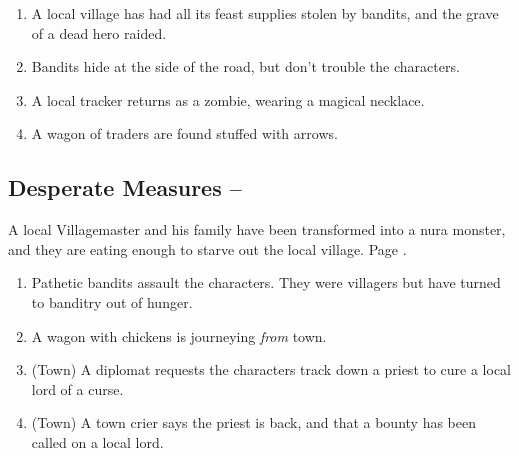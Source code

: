 \begin{enumerate}

	\item{A local village has had all its feast supplies stolen by bandits, and the grave of a dead hero raided.}
	\item{Bandits hide at the side of the road, but don't trouble the characters.}
	\item{A local tracker returns as a zombie, wearing a magical necklace.}
	\item{A wagon of traders are found stuffed with arrows.}
\end{enumerate}

\subsection[Desperate Measures]{Desperate Measures -- \encnum}
A local Villagemaster and his family have been transformed into a nura monster, and they are eating enough to starve out the local village.
Page \pageref{desperatemeasures}.

\begin{enumerate}

	\item{ Pathetic bandits assault the characters.  They were villagers but have turned to banditry out of hunger.}
	\item{A wagon with chickens is journeying \emph{from} town.}
	\item{ (Town) A diplomat requests the characters track down a priest to cure a local lord of a curse.}
	\item{ (Town) A town crier says the priest is back, and that a bounty has been called on a local lord.}
\end{enumerate}


